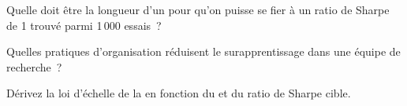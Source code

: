 \begin{interviewq}\label{iq:rs:overfitting:4}
Quelle doit être la longueur d'un  pour qu'on puisse se fier à un ratio de Sharpe de 1 trouvé parmi 1\,000 essais~?
\end{interviewq}

\begin{interviewq}\label{iq:rs:overfitting:5}
Quelles pratiques d'organisation réduisent le surapprentissage dans une équipe de recherche~?
\end{interviewq}

\begin{interviewq}\label{iq:rs:overfitting:6}
Dérivez la loi d'échelle de la  en fonction du  et du ratio de Sharpe cible.
\end{interviewq}
